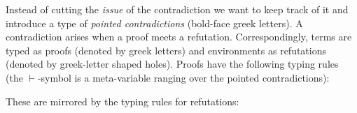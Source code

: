 \documentclass{ecai}
\begin{document}
\begin{center}
  \begin{minipage}{0.48\linewidth}
    \begin{prooftree}\label{rule: S-ELIM}
    \end{prooftree}
  \end{minipage}
\end{center}

Instead of cutting the \emph{issue} of the contradiction we want to keep track of it and introduce a type of \emph{pointed contradictions} (bold-face greek letters).
A contradiction arises when a proof meets a refutation.
Correspondingly, terms are typed as proofs (denoted by greek letters) and environments as refutations (denoted by greek-letter shaped holes).
Proofs have the following typing rules (the $\vdash$-symbol is a meta-variable ranging over the pointed contradictions):

\begin{center}
  \begin{minipage}{0.48\linewidth}
    \centering
    \begin{prooftree}\label{axiom:proofs}
    \end{prooftree}
  \end{minipage}
  \begin{minipage}{0.48\linewidth}
    \centering
    \begin{prooftree}\label{rule:proimplintro}
    \end{prooftree}
  \end{minipage}
\end{center}
\begin{center}
  \smallskip
  \begin{minipage}{0.48\linewidth}
    \centering
    \begin{prooftree}\label{rule:support}
    \end{prooftree}
  \end{minipage}
  \begin{minipage}{0.48\linewidth}
    \centering
    \begin{prooftree}\label{rule: R-ELIM}
    \end{prooftree}
  \end{minipage}
\end{center}

These are mirrored by the typing rules for refutations:
\end{document}
